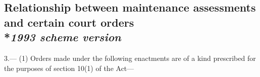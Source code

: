 \documentclass[12pt,a4paper]{article}
\begin{document}

\subsection[3. Relationship between maintenance assessments and certain court orders --- \emph{1993 scheme version}]{\sloppy Relationship between maintenance assessments and certain court orders\\*\emph{1993 scheme version}}

3.—%
%
%
%
%
%
%
(1) Orders made under the following enactments are of a kind prescribed for the purposes of section 10(1) of the Act—
\end{document}
